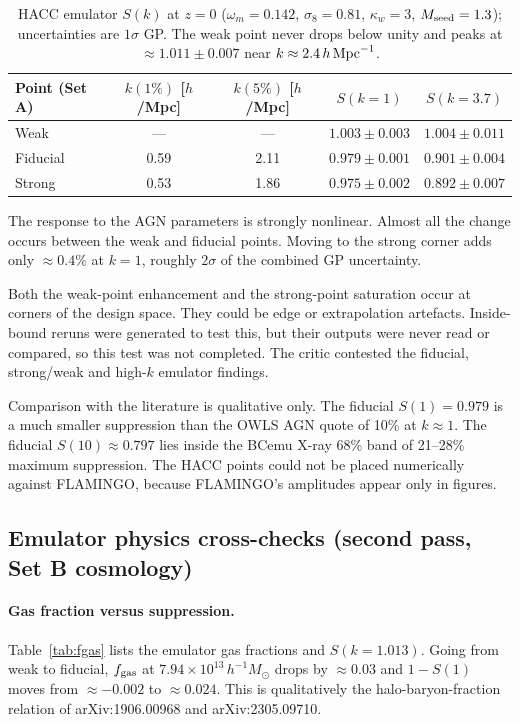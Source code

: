 \documentclass[11pt,a4paper]{article}
\begin{document}
\begin{table}
\centering
\begin{tabular}{lcccc}
\toprule
Point (Set A) & $k(1\%)$ [$h$/Mpc] & $k(5\%)$ [$h$/Mpc] & $S(k=1)$ & $S(k=3.7)$ \\
\midrule
Weak & --- & --- & $1.003\pm0.003$ & $1.004\pm0.011$ \\
Fiducial & 0.59 & 2.11 & $0.979\pm0.001$ & $0.901\pm0.004$ \\
Strong & 0.53 & 1.86 & $0.975\pm0.002$ & $0.892\pm0.007$ \\
\bottomrule
\end{tabular}
\caption{HACC emulator $S(k)$ at $z=0$ ($\omega_m=0.142$, $\sigma_8=0.81$, $\kappa_w=3$, $M_{\rm seed}=1.3$); uncertainties are $1\sigma$ GP. The weak point never drops below unity and peaks at $\approx1.011\pm0.007$ near $k\approx2.4\,h\,{\rm Mpc}^{-1}$.}
\label{tab:hacc}
\end{table}

The response to the AGN parameters is strongly nonlinear. Almost all the change occurs between the weak and fiducial points. Moving to the strong corner adds only $\approx0.4\%$ at $k=1$, roughly $2\sigma$ of the combined GP uncertainty.

Both the weak-point enhancement and the strong-point saturation occur at corners of the design space. They could be edge or extrapolation artefacts. Inside-bound reruns were generated to test this, but their outputs were never read or compared, so this test was not completed. The critic contested the fiducial, strong/weak and high-$k$ emulator findings.

Comparison with the literature is qualitative only. The fiducial $S(1)=0.979$ is a much smaller suppression than the OWLS AGN quote of 10\% at $k\approx1$. The fiducial $S(10)\approx0.797$ lies inside the BCemu X-ray 68\% band of 21--28\% maximum suppression. The HACC points could not be placed numerically against FLAMINGO, because FLAMINGO's amplitudes appear only in figures.

\subsection{Emulator physics cross-checks (second pass, Set B cosmology)}
\paragraph{Gas fraction versus suppression.} Table~\ref{tab:fgas} lists the emulator gas fractions and $S(k=1.013)$. Going from weak to fiducial, $f_{\rm gas}$ at $7.94\times10^{13}\,h^{-1}M_\odot$ drops by $\approx0.03$ and $1-S(1)$ moves from $\approx-0.002$ to $\approx0.024$. This is qualitatively the halo-baryon-fraction relation of arXiv:1906.00968 and arXiv:2305.09710.
\end{document}
